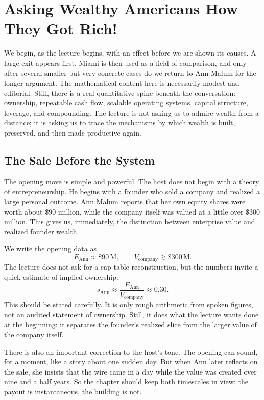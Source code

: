 \chapter{Asking Wealthy Americans How They Got Rich!}

We begin, as the lecture begins, with an effect before we are shown its causes. A large exit appears first, Miami is then used as a field of comparison, and only after several smaller but very concrete cases do we return to Ann Malum for the longer argument. The mathematical content here is necessarily modest and editorial. Still, there is a real quantitative spine beneath the conversation: ownership, repeatable cash flow, scalable operating systems, capital structure, leverage, and compounding. The lecture is not asking us to admire wealth from a distance; it is asking us to trace the mechanisms by which wealth is built, preserved, and then made productive again.

\section{The Sale Before the System}

The opening move is simple and powerful. The host does not begin with a theory of entrepreneurship. He begins with a founder who sold a company and realized a large personal outcome. Ann Malum reports that her own equity shares were worth about \$90 million, while the company itself was valued at a little over \$300 million. This gives us, immediately, the distinction between enterprise value and realized founder wealth.

We write the opening data as
\begin{equation}
E_{\mathrm{Ann}} \approx \$90\,\mathrm{M},
\qquad
V_{\mathrm{company}} \gtrsim \$300\,\mathrm{M}.
\end{equation}
The lecture does not ask for a cap-table reconstruction, but the numbers invite a quick estimate of implied ownership:
\begin{equation}
s_{\mathrm{Ann}} \approx \frac{E_{\mathrm{Ann}}}{V_{\mathrm{company}}} \approx 0.30.
\end{equation}
This should be stated carefully. It is only rough arithmetic from spoken figures, not an audited statement of ownership. Still, it does what the lecture wants done at the beginning: it separates the founder's realized slice from the larger value of the company itself.

There is also an important correction to the host's tone. The opening can sound, for a moment, like a story about one sudden day. But when Ann later reflects on the sale, she insists that the wire came in a day while the value was created over nine and a half years. So the chapter should keep both timescales in view: the payout is instantaneous, the building is not.

